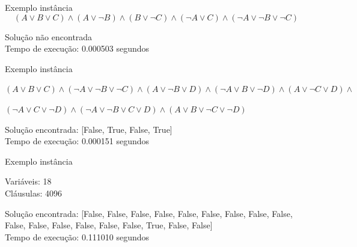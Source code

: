 \documentclass[compress,aspectratio=169]{beamer}
\begin{document}
    \begin{frame}{Exemplo instância}
        \[(A \lor B \lor C) \land (A \lor \neg B) \land (B \lor \neg C) \land (\neg A \lor C) \land (\neg A \lor \neg B \lor \neg C)\]
        
        \begin{tcolorbox}[title=Saída da instância, width=\linewidth, fontupper=\ttfamily, halign=flush left]
            Solução não encontrada \\
            Tempo de execução: 0.000503 segundos \\  
        \end{tcolorbox}
    \end{frame}
    \begin{frame}{Exemplo instância}
        \begin{center}
            \((A \lor B \lor C) \land (\neg A \lor \neg B \lor \neg C) \land (A \lor \neg B \lor D) \land (\neg A \lor B \lor \neg D) \land (A \lor \neg C \lor D) \land \)

            \((\neg A \lor C \lor \neg D) \land (\neg A \lor \neg B \lor C \lor D) \land (A \lor B \lor \neg C \lor \neg D)\)
            
        \end{center}
        
        \begin{tcolorbox}[title=Saída da instância, width=\linewidth, fontupper=\ttfamily, halign=flush left]
            Solução encontrada: [False, True, False, True] \\
            Tempo de execução: 0.000151 segundos
        \end{tcolorbox}
    \end{frame}
    \begin{frame}{Exemplo instância}
        \begin{tcolorbox}[title=Entrada da instância, width=\linewidth, fontupper=\ttfamily,  halign=flush left]
            Variáveis: 18 \\
            Cláusulas: 4096
        \end{tcolorbox}
        \begin{tcolorbox}[title=Saída da instância, width=\linewidth, fontupper=\ttfamily, halign=flush left]
            Solução encontrada: [False, False, False, False, False, False, False, False, False, False, False, False, False, False, False, True, False, False] \\
            Tempo de execução: 0.111010 segundos
        \end{tcolorbox}
    \end{frame}
\end{document}
